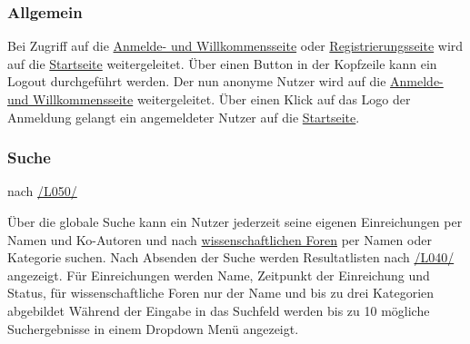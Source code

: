\subsubsection{Allgemein}
\begin{description}
     Bei Zugriff auf die \hyperref[an:log]{Anmelde- und Willkommensseite} oder \hyperref[an:reg]{Registrierungsseite}
    wird auf die \hyperref[nut:start]{Startseite} weitergeleitet.
     Über einen Button in der Kopfzeile kann ein Logout durchgeführt werden.
    Der nun anonyme Nutzer wird auf die \hyperref[an:log]{Anmelde- und Willkommensseite} weitergeleitet.
     Über einen Klick auf das Logo der Anmeldung gelangt ein angemeldeter Nutzer auf die
    \hyperref[nut:start]{Startseite}.
\end{description}

\subsubsection{Suche} nach \hyperref[leist:050]{/L050/}
\begin{description}
     Über die globale Suche kann ein Nutzer jederzeit seine eigenen Einreichungen per Namen und Ko-Autoren
    und nach \hyperref[glo:wissForum]{wissenschaftlichen Foren} per Namen oder Kategorie
    suchen. Nach Absenden der Suche werden Resultatlisten nach \hyperref[leist:40]{/L040/} angezeigt.
    Für Einreichungen werden Name, Zeitpunkt der Einreichung und Status, für wissenschaftliche Foren nur der Name und
    bis zu drei Kategorien abgebildet
     Während der Eingabe in das Suchfeld werden bis zu 10 mögliche Suchergebnisse in
    einem Dropdown Menü angezeigt.
\end{description}

